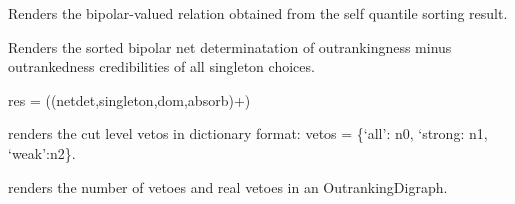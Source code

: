 \documentclass[letterpaper,10pt,english]{sphinxmanual}
\begin{document}
\begin{fulllineitems}
\begin{fulllineitems}
\end{fulllineitems}


\begin{fulllineitems}
\label{techDoc:outrankingDigraphs.OutrankingDigraph.computeQuantileSortRelation}
Renders the bipolar-valued relation obtained from
the self quantile sorting result.

\end{fulllineitems}


\begin{fulllineitems}
\label{techDoc:outrankingDigraphs.OutrankingDigraph.computeSingletonRanking}
Renders the sorted bipolar net determinatation of outrankingness
minus outrankedness credibilities of all singleton choices.

res = ((netdet,singleton,dom,absorb)+)

\end{fulllineitems}


\begin{fulllineitems}
\label{techDoc:outrankingDigraphs.OutrankingDigraph.computeVetoesStatistics}
renders the cut level vetos in dictionary format:
vetos = \{`all': n0, `strong: n1, `weak':n2\}.

\end{fulllineitems}


\begin{fulllineitems}
\label{techDoc:outrankingDigraphs.OutrankingDigraph.computeVetosShort}
renders the number of vetoes and real vetoes in an OutrankingDigraph.

\end{fulllineitems}



\end{fulllineitems}
\end{document}
